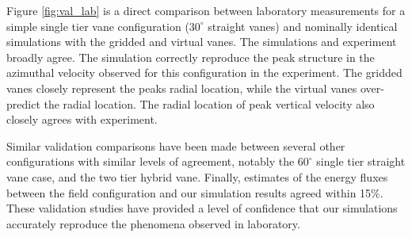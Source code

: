 


Figure \ref{fig:val_lab} is a direct comparison between laboratory 
measurements for a simple single tier vane configuration ($30^{\circ}$
straight vanes) and nominally identical simulations with the gridded and
virtual vanes. The simulations and experiment broadly agree. The
simulation correctly reproduce the peak structure in the azimuthal
velocity observed for this configuration in the experiment. The gridded
vanes closely represent the peaks radial location, while the
virtual vanes over-predict the radial location. The radial location of
peak vertical velocity also closely agrees with experiment.

Similar validation comparisons have been made between several other
configurations with similar levels of agreement,  notably the
$60^{\circ}$ single tier straight vane case, and the two tier hybrid
vane.  Finally, estimates of the energy fluxes between the field
configuration and our simulation results agreed within 15\%. These
validation studies have provided a level of confidence that our
simulations accurately reproduce the phenomena observed in laboratory.

